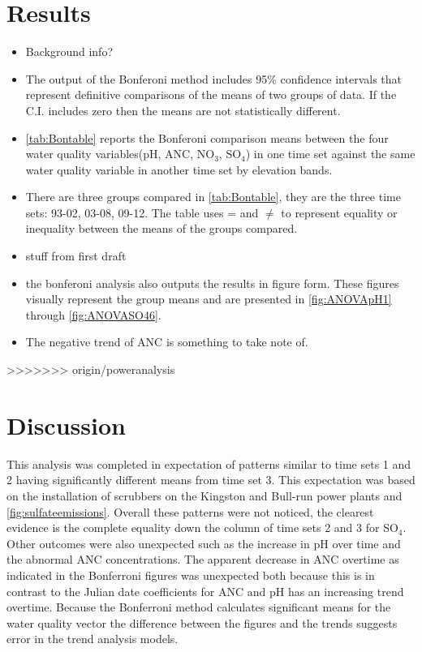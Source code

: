 \section{Results}
\begin{itemize}
	\item Background info?
	\item The output of the Bonferoni method includes 95\% confidence intervals that represent definitive comparisons of the means of two groups of data.  If the C.I. includes zero then the means are not statistically different.
	\item \autoref{tab:Bontable} reports the Bonferoni comparison means between the four water quality variables(pH, ANC, NO$_3$, SO$_4$) in one time set against the same water quality variable in another time set by elevation bands.
	\item There are three groups compared in \autoref{tab:Bontable}, they are the three time sets: 93-02, 03-08, 09-12.  The table uses = and $\neq$ to represent equality or inequality between the means of the groups compared.
	\item stuff from first draft
	\item the bonferoni analysis also outputs the results in figure form.  These figures visually represent the group means and are presented in \autoref{fig:ANOVApH1} through \autoref{fig:ANOVASO46}.%
	\item The negative trend of ANC is something to take note of.
\end{itemize}
>>>>>>> origin/poweranalysis
\section{Discussion}
This analysis was completed in expectation of patterns similar to time sets 1 and 2 having significantly different means from time set 3.
This expectation was based on the installation of scrubbers on the Kingston and Bull-run power plants and \autoref{fig:sulfateemissions}.
Overall these patterns were not noticed, the clearest evidence is the complete equality down the column of time sets 2 and 3 for SO$_4$.
Other outcomes were also unexpected such as the increase in pH over time and the abnormal ANC concentrations.
The apparent decrease in ANC overtime as indicated in the Bonferroni figures was unexpected both because this is in contrast to the Julian date coefficients for ANC and pH has an increasing trend overtime.
Because the Bonferroni method calculates significant means for the water quality vector the difference between the figures and the trends suggests error in the trend analysis models.

